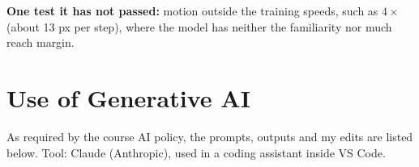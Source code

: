 \documentclass[11pt]{article}
\begin{document}
\textbf{One test it has not passed:} motion outside the training speeds, such as $4\times$ (about 13 px per step), where the model has neither the familiarity nor much reach margin.

\newpage
\section*{Use of Generative AI}

As required by the course AI policy, the prompts, outputs and my edits are listed below. Tool: Claude (Anthropic), used in a coding assistant inside VS Code.
\end{document}
